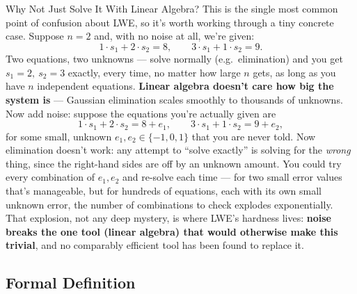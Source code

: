\begin{rmkbox}{Why Not Just Solve It With Linear Algebra?}
This is the single most common point of confusion about LWE, so it's worth working through a tiny concrete case. Suppose $n=2$ and, with no noise at all, we're given:
$$
1\cdot s_1 + 2\cdot s_2 = 8, \qquad 3\cdot s_1 + 1\cdot s_2 = 9.
$$
Two equations, two unknowns --- solve normally (e.g.\ elimination) and you get $s_1=2,\ s_2=3$ exactly, every time, no matter how large $n$ gets, as long as you have $n$ independent equations. \textbf{Linear algebra doesn't care how big the system is} --- Gaussian elimination scales smoothly to thousands of unknowns. Now add noise: suppose the equations you're actually given are
$$
1\cdot s_1 + 2\cdot s_2 = 8 + e_1, \qquad 3\cdot s_1 + 1\cdot s_2 = 9 + e_2,
$$
for some small, unknown $e_1, e_2 \in \{-1,0,1\}$ that you are never told. Now elimination doesn't work: any attempt to ``solve exactly'' is solving for the \emph{wrong} thing, since the right-hand sides are off by an unknown amount. You could try every combination of $e_1, e_2$ and re-solve each time --- for two small error values that's manageable, but for hundreds of equations, each with its own small unknown error, the number of combinations to check explodes exponentially. That explosion, not any deep mystery, is where LWE's hardness lives: \textbf{noise breaks the one tool (linear algebra) that would otherwise make this trivial}, and no comparably efficient tool has been found to replace it.
\end{rmkbox}

\subsection{Formal Definition}
\label{sec:L2:formal-definition}


